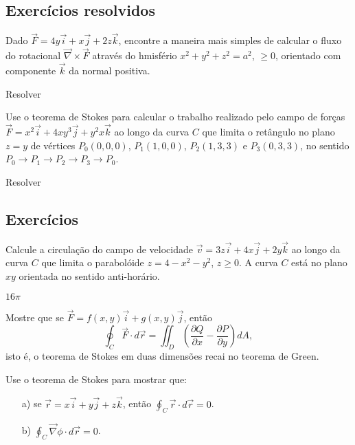 \subsection{Exercícios resolvidos}
\begin{exeresol}
 Dado $\vec{F}=4y\vec{i}+x\vec{j}+2z\vec{k}$, encontre a maneira mais simples de calcular o fluxo do rotacional $\vec{\nabla}\times\vec{F}$ através do hmisfério $x^2+y^2+z^2=a^2$, $\geq 0$, orientado com componente $\vec{k}$ da normal positiva.
\end{exeresol}
\begin{resol}
 Resolver
\end{resol}
\begin{exeresol}
Use o teorema de Stokes para calcular o trabalho realizado pelo campo de forças $\vec{F}=x^2\vec{i}+4xy^3\vec{j}+y^2x\vec{k}$ ao longo da curva $C$ que limita o retângulo no plano $z=y$ de vértices $P_0(0,0,0)$, $P_1(1,0,0)$, $P_2(1,3,3)$ e $P_3(0,3,3)$, no sentido $P_0\to P_1\to P_2\to P_3\to P_0$.
\end{exeresol}
\begin{resol}
 Resolver
\end{resol}


\subsection*{Exercícios}
\begin{exer}
 Calcule a circulação do campo de velocidade $\vec{v}=3z\vec{i}+4x\vec{j}+2y\vec{k}$ ao longo da curva $C$ que limita o parabolóide $z=4-x^2-y^2$, $z\geq 0$. A curva $C$ está no plano $xy$ orientada no sentido anti-horário.
 \end{exer}
\begin{resp}
 $16\pi$
\end{resp}
\begin{exer}Mostre que se $\vec{F}=f(x,y)\vec{i}+g(x,y)\vec{j}$, então
$$
\oint_C  \vec{F} \cdot d\vec{r}=\iint_{D} \left(\frac{\partial Q}{\partial x} - \frac{\partial P}{\partial
y}\right) dA,
$$
isto é, o teorema de Stokes em duas dimensões recai no teorema de Green.
\end{exer}
\begin{exer}Use o teorema de Stokes para mostrar que:
\begin{itemize}
 \item[a)] se $\vec{r}=x\vec{i}+y\vec{j}+z\vec{k}$, então $\oint_C\vec{r}\cdot d\vec{r}=0$.
 \item[b)] $\oint_C\vec{\nabla}\phi\cdot d\vec{r}=0$. 
\end{itemize}
\end{exer}

